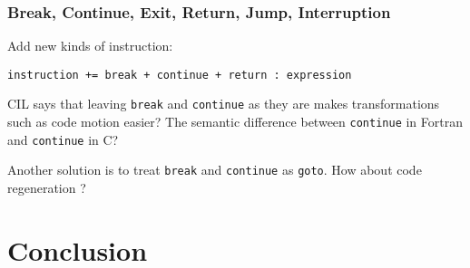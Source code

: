 \documentclass[a4paper]{article}
\begin{document}
\subsubsection{Break, Continue, Exit, Return, Jump, Interruption}
Add new kinds of instruction: 

\verb/instruction += break + continue + return : expression/

CIL says that leaving \verb/break/ and \verb/continue/ as they are  makes transformations such as code motion
easier? The semantic difference between \verb/continue/ in Fortran and
\verb/continue/ in C?

Another solution is to treat \verb/break/ and \verb/continue/ as
\verb/goto/. How about code regeneration ?  
\section*{Conclusion}
\nocite{Kern78, Necu02}
\newpage
\end{document}

